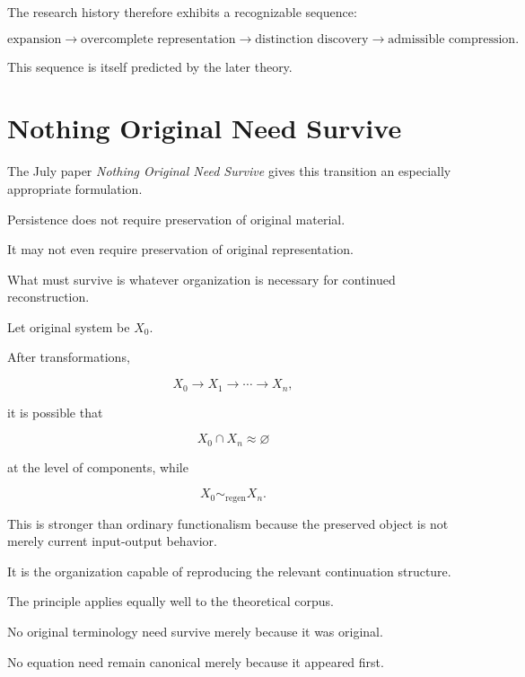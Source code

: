 \documentclass[11pt]{article}
\theoremstyle{remark}
\begin{document}
The research history therefore exhibits a recognizable sequence:

\begin{equation}
\text{expansion}
\rightarrow
\text{overcomplete representation}
\rightarrow
\text{distinction discovery}
\rightarrow
\text{admissible compression}.
\end{equation}

This sequence is itself predicted by the later theory.

\section{Nothing Original Need Survive}

The July paper \emph{Nothing Original Need Survive} gives this transition an especially appropriate formulation.

Persistence does not require preservation of original material.

It may not even require preservation of original representation.

What must survive is whatever organization is necessary for continued reconstruction.

Let original system be $X_0$.

After transformations,

\begin{equation}
X_0
\rightarrow
X_1
\rightarrow
\cdots
\rightarrow
X_n,
\end{equation}

it is possible that

\begin{equation}
X_0\cap X_n
\approx
\varnothing
\end{equation}

at the level of components, while

\begin{equation}
X_0
\sim_{\mathrm{regen}}
X_n.
\end{equation}

This is stronger than ordinary functionalism because the preserved object is not merely current input-output behavior.

It is the organization capable of reproducing the relevant continuation structure.

The principle applies equally well to the theoretical corpus.

No original terminology need survive merely because it was original.

No equation need remain canonical merely because it appeared first.
\end{document}
